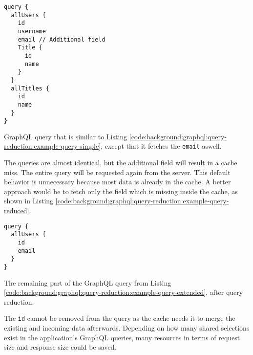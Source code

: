 \ifshowListings
\begin{listing}[H]
  \begin{verbatim}
query {
  allUsers {
    id
    username
    email // Additional field
    Title {
      id
      name
    }
  }
  allTitles {
    id
    name
  }
}
  \end{verbatim}
  \caption{GraphQL query that is similar to Listing \ref{code:background:graphql:query-reduction:example-query-simple}, except that it fetches the \texttt{email} aswell.}\label{code:background:graphql:query-reduction:example-query-extended}
\end{listing}
\fi

\noindent The queries are almost identical, but the additional field will result in a cache miss. The entire query will be requested again from the server. This default behavior is unnecessary because most data is already in the cache. A better approach would be to fetch only the field which is missing inside the cache, as shown in Listing \ref{code:background:graphql:query-reduction:example-query-reduced}.

\ifshowListings
\begin{listing}[H]
  \begin{verbatim}
query {
  allUsers {
    id
    email
  }
}
  \end{verbatim}
  \caption{The remaining part of the GraphQL query from Listing \ref{code:background:graphql:query-reduction:example-query-extended}, after query reduction.}\label{code:background:graphql:query-reduction:example-query-reduced}
\end{listing}
\fi

\noindent The \texttt{id} cannot be removed from the query as the cache needs it to merge the existing and incoming data afterwards. Depending on how many shared selections exist in the application's GraphQL queries, many resources in terms of request size and response size could be saved.
